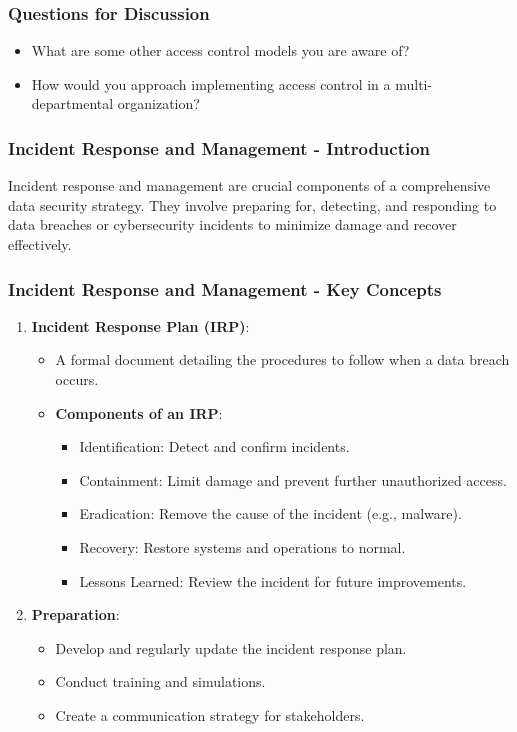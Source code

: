 \documentclass{beamer}
\begin{document}
\begin{frame}[fragile]
    \frametitle{Questions for Discussion}
    \begin{itemize}
        \item What are some other access control models you are aware of?
        \item How would you approach implementing access control in a multi-departmental organization?
    \end{itemize}
\end{frame}

\begin{frame}[fragile]
    \frametitle{Incident Response and Management - Introduction}
    Incident response and management are crucial components of a comprehensive data security strategy. They involve preparing for, detecting, and responding to data breaches or cybersecurity incidents to minimize damage and recover effectively.
\end{frame}

\begin{frame}[fragile]
    \frametitle{Incident Response and Management - Key Concepts}
    \begin{enumerate}
        \item \textbf{Incident Response Plan (IRP)}:
        \begin{itemize}
            \item A formal document detailing the procedures to follow when a data breach occurs.
            \item \textbf{Components of an IRP}:
            \begin{itemize}
                \item Identification: Detect and confirm incidents.
                \item Containment: Limit damage and prevent further unauthorized access.
                \item Eradication: Remove the cause of the incident (e.g., malware).
                \item Recovery: Restore systems and operations to normal.
                \item Lessons Learned: Review the incident for future improvements.
            \end{itemize}
        \end{itemize}
        
        \item \textbf{Preparation}:
        \begin{itemize}
            \item Develop and regularly update the incident response plan.
            \item Conduct training and simulations.
            \item Create a communication strategy for stakeholders.
        \end{itemize}
    \end{enumerate}
\end{frame}
\end{document}
